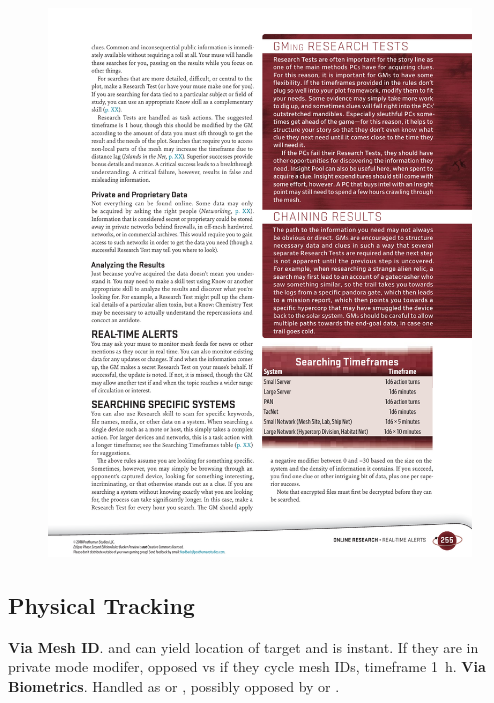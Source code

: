\begin{figure}[htbp!]%
   \includegraphics[scale=0.9]{gfx/mesh-search-time}%
\end{figure}%


\subsection*{Physical Tracking}

\begin{itemize}
   \itembox \textbf{Via Mesh ID}.  and can yield location of target and is instant. If they are in private mode  modifer, opposed vs  if they cycle mesh IDs, timeframe \SI{1}{h}.
   \itembox \textbf{Via Biometrics}. Handled as  or , possibly opposed by  or .
\end{itemize}


